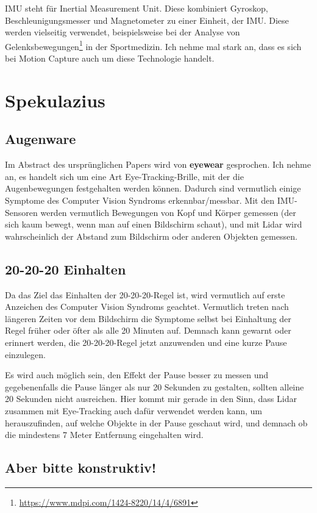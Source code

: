 IMU steht für Inertial Measurement Unit. Diese kombiniert Gyroskop, Beschleunigungsmesser und Magnetometer zu einer Einheit, der IMU.
Diese werden vielseitig verwendet, beispielsweise bei der Analyse von Gelenksbewegungen\footnote{\url{https://www.mdpi.com/1424-8220/14/4/6891}} in der Sportmedizin. Ich nehme mal stark an, dass es sich bei Motion Capture auch um diese Technologie handelt.

\section{Spekulazius}

\subsection{Augenware}

Im Abstract des ursprünglichen Papers wird von \textbf{eyewear} gesprochen. Ich nehme an, es handelt sich um eine Art Eye-Tracking-Brille, mit der die Augenbewegungen festgehalten werden können. Dadurch sind vermutlich einige Symptome des Computer Vision Syndroms erkennbar/messbar. Mit den IMU-Sensoren werden vermutlich Bewegungen von Kopf und Körper gemessen (der sich kaum bewegt, wenn man auf einen Bildschirm schaut), und mit Lidar wird wahrscheinlich der Abstand zum Bildschirm oder anderen Objekten gemessen.

\subsection{20-20-20 Einhalten}

Da das Ziel das Einhalten der 20-20-20-Regel ist, wird vermutlich auf erste Anzeichen des Computer Vision Syndroms geachtet. Vermutlich treten nach längeren Zeiten vor dem Bildschirm die Symptome selbst bei Einhaltung der Regel früher oder öfter als alle 20 Minuten auf.
Demnach kann gewarnt oder erinnert werden, die 20-20-20-Regel jetzt anzuwenden und eine kurze Pause einzulegen.

Es wird auch möglich sein, den Effekt der Pause besser zu messen und gegebenenfalls die Pause länger als nur 20 Sekunden zu gestalten, sollten alleine 20 Sekunden nicht ausreichen. Hier kommt mir gerade in den Sinn, dass Lidar zusammen mit Eye-Tracking auch dafür verwendet werden kann, um herauszufinden, auf welche Objekte in der Pause geschaut wird, und demnach ob die mindestens 7 Meter Entfernung eingehalten wird.

\subsection{Aber bitte konstruktiv!}

